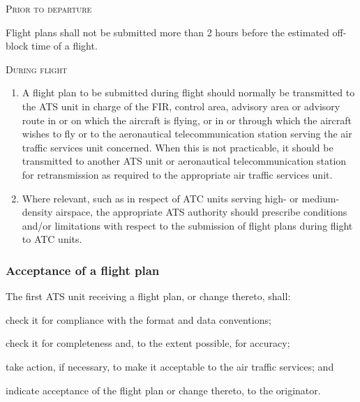 \documentclass[../main.tex]{subfiles}
\begin{document}
    \begin{enumeratesc}
        \item \textsc{Prior to departure}
        \begin{enumempty}
            \item Flight plans shall not be submitted more than 2 hours before the estimated off-block time of a flight.
        \end{enumempty}

        \item \textsc{During flight}
        \begin{enumerate}
            \item A flight plan to be submitted during flight should normally be transmitted to the ATS unit in charge of the FIR, control area, advisory area or advisory route in or on which the aircraft is flying, or in or through which the aircraft wishes to fly or to the aeronautical telecommunication station serving the air traffic services unit concerned. When this is not practicable, it should be transmitted to another ATS unit or aeronautical telecommunication station for retransmission as required to the appropriate air traffic services unit.
            \item Where relevant, such as in respect of ATC units serving high- or medium-density airspace, the appropriate ATS authority should prescribe conditions and/or limitations with respect to the submission of flight plans during flight to ATC units.

        \end{enumerate}
    \end{enumeratesc}

    \subsubsection{Acceptance of a flight plan}

    The first ATS unit receiving a flight plan, or change thereto, shall:

    \begin{enumalph}
        \item check it for compliance with the format and data conventions;
        \item check it for completeness and, to the extent possible, for accuracy;
        \item take action, if necessary, to make it acceptable to the air traffic services; and
        \item indicate acceptance of the flight plan or change thereto, to the originator.
    \end{enumalph}
\end{document}
